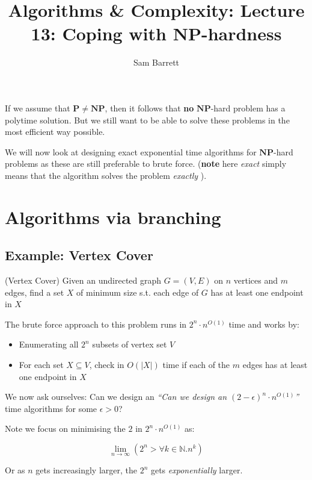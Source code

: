 \documentclass{article}
\title{Algorithms \& Complexity: Lecture 13: Coping with $\mathbf{NP}$-hardness}
\author{Sam Barrett}
\newcommand{\NP}{\mathbf{NP}}
\renewcommand{\P}{\mathbf{P}}
\begin{document}
\maketitle


If we assume that $\P \neq \NP$, then it follows that \textbf{no } $\NP$-hard problem has a polytime solution. But we still want to be able to solve these problems in the most efficient way possible.

We will now look at designing exact exponential time algorithms for $\NP$-hard problems as these are still preferable to brute force. (\textbf{note} here \textit{exact} simply means that the algorithm solves the problem \textit{exactly} ).

\section{Algorithms via branching}

\subsection{Example: Vertex Cover}

\begin{problem}(Vertex Cover)
  Given an undirected graph $G = (V,E)$ on $n$ vertices and $m$ edges, find a set $X$ of minimum size s.t. each edge of $G$ has at least one endpoint in $X$
\end{problem}

The brute force approach to this problem runs in $2^{n} \cdot n^{O(1)}$ time and works by:

\begin{itemize}
  \item Enumerating all $2^{n}$ subsets of vertex set $V$
  \item For each set $X \subseteq V$, check in $O(|X|)$ time if each of the $m$ edges has at least one endpoint in $X$
\end{itemize}

We now ask ourselves: Can we design an \textit{``Can we design an $(2-\epsilon)^{n} \cdot n^{O(1)}$''} time algorithms for some $\epsilon > 0$?

Note we focus on minimising the $2$ in $2^{n} \cdot n^{O(1)}$ as:

\[
  \lim_{n\rightarrow \infty} \left( 2^{n} > \forall k \in \mathbb{N}. n^{k} \right)
\]

Or as $n$ gets increasingly larger, the $2^{n}$ gets \textit{exponentially} larger.
\end{document}

